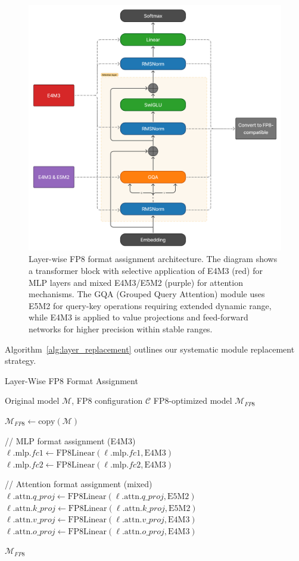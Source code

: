 \documentclass[conference]{IEEEtran}
\begin{document}
\begin{figure}[htbp]
    \centering
    \includegraphics[width=0.85\columnwidth]{fp8_convert.png}
    \caption{Layer-wise FP8 format assignment architecture. The diagram shows a transformer block with selective application of E4M3 (red) for MLP layers and mixed E4M3/E5M2 (purple) for attention mechanisms. The GQA (Grouped Query Attention) module uses E5M2 for query-key operations requiring extended dynamic range, while E4M3 is applied to value projections and feed-forward networks for higher precision within stable ranges.}
    \label{fig:fp8_architecture}
\end{figure}

Algorithm~\ref{alg:layer_replacement} outlines our systematic module replacement strategy.

\begin{algorithm}[hbt!]
\caption{Layer-Wise FP8 Format Assignment}
\label{alg:layer_replacement}
\begin{algorithmic}
\Require Original model $\mathcal{M}$, FP8 configuration $\mathcal{C}$
\Ensure FP8-optimized model $\mathcal{M}_{FP8}$

\State $\mathcal{M}_{FP8} \gets \text{copy}(\mathcal{M})$

    \State // MLP format assignment (E4M3)
    \State $\ell.\text{mlp}.fc1 \gets \text{FP8Linear}(\ell.\text{mlp}.fc1, \text{E4M3})$
    \State $\ell.\text{mlp}.fc2 \gets \text{FP8Linear}(\ell.\text{mlp}.fc2, \text{E4M3})$
    
    \State // Attention format assignment (mixed)
    \State $\ell.\text{attn}.q\_proj \gets \text{FP8Linear}(\ell.\text{attn}.q\_proj, \text{E5M2})$
    \State $\ell.\text{attn}.k\_proj \gets \text{FP8Linear}(\ell.\text{attn}.k\_proj, \text{E5M2})$
    \State $\ell.\text{attn}.v\_proj \gets \text{FP8Linear}(\ell.\text{attn}.v\_proj, \text{E4M3})$
    \State $\ell.\text{attn}.o\_proj \gets \text{FP8Linear}(\ell.\text{attn}.o\_proj, \text{E4M3})$
\EndFor

\State \Return $\mathcal{M}_{FP8}$
\end{algorithmic}
\end{algorithm}
\end{document}
